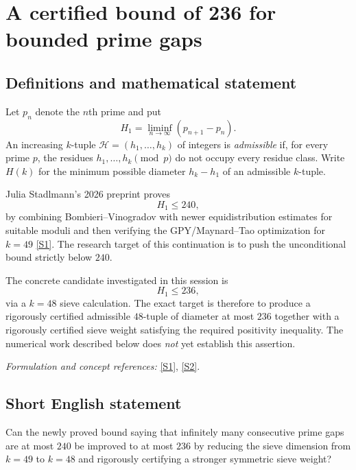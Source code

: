 \documentclass[11pt]{article}
\begin{document}
\section*{\texorpdfstring{A certified bound of 236 for bounded prime gaps}{A certified bound of 236 for bounded prime gaps}}\label{prime-gaps-below-240}\label{statement}

\subsection{Definitions and mathematical statement}
Let $p_n$ denote the $n$th prime and put
\[
 H_1=\liminf_{n\to\infty}(p_{n+1}-p_n).
\]
An increasing $k$-tuple $\mathcal H=(h_1,\ldots,h_k)$ of integers is \emph{admissible} if, for every prime $p$, the residues $h_1,\ldots,h_k\pmod p$ do not occupy every residue class.  Write $H(k)$ for the minimum possible diameter $h_k-h_1$ of an admissible $k$-tuple.

Julia Stadlmann's 2026 preprint proves
\[
 \boxed{H_1\le 240},
\]
by combining Bombieri--Vinogradov with newer equidistribution estimates for suitable moduli and then verifying the GPY/Maynard--Tao optimization for $k=49$ \href{https://arxiv.org/abs/2608.31126}{[S1]}.  The research target of this continuation is to push the unconditional bound strictly below $240$.

The concrete candidate investigated in this session is
\[
 \boxed{H_1\le 236},
\]
via a $k=48$ sieve calculation.  The exact target is therefore to produce a rigorously certified admissible $48$-tuple of diameter at most $236$ together with a rigorously certified sieve weight satisfying the required positivity inequality.  The numerical work described below does \emph{not} yet establish this assertion.

\par\smallskip\textit{Formulation and concept references:} \href{https://arxiv.org/abs/2608.31126}{[S1]}, \href{https://arxiv.org/abs/1407.4897}{[S2]}.

\subsection{Short English statement}
Can the newly proved bound saying that infinitely many consecutive prime gaps are at most $240$ be improved to at most $236$ by reducing the sieve dimension from $k=49$ to $k=48$ and rigorously certifying a stronger symmetric sieve weight?
\end{document}
